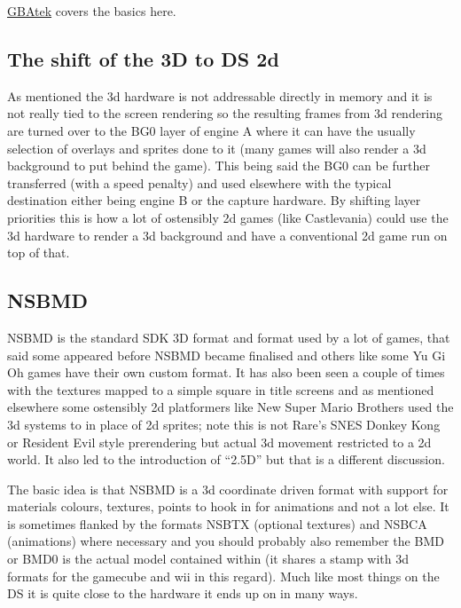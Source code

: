\documentclass[
]{book}
\begin{document}
\href{http://problemkaputt.de/gbatek.htm\#ds3dmatrixloadmultiply}{GBAtek} covers the basics here.

\hypertarget{the-shift-of-the-3d-to-ds-2d}{%
\subsection{The shift of the 3D to DS 2d}\label{the-shift-of-the-3d-to-ds-2d}}

As mentioned the 3d hardware is not addressable directly in memory and it is not really tied to the screen rendering so the resulting frames from 3d rendering are turned over to the BG0 layer of engine A where it can have the usually selection of overlays and sprites done to it (many games will also render a 3d background to put behind the game). This being said the BG0 can be further transferred (with a speed penalty) and used elsewhere with the typical destination either being engine B or the capture hardware. By shifting layer priorities this is how a lot of ostensibly 2d games (like Castlevania) could use the 3d hardware to render a 3d background and have a conventional 2d game run on top of that.

\hypertarget{nsbmd}{%
\subsection{NSBMD}\label{nsbmd}}

NSBMD is the standard SDK 3D format and format used by a lot of games, that said some appeared before NSBMD became finalised and others like some Yu Gi Oh games have their own custom format. It has also been seen a couple of times with the textures mapped to a simple square in title screens and as mentioned elsewhere some ostensibly 2d platformers like New Super Mario Brothers used the 3d systems to in place of 2d sprites; note this is not Rare's SNES Donkey Kong or Resident Evil style prerendering but actual 3d movement restricted to a 2d world. It also led to the introduction of ``2.5D'' but that is a different discussion.

The basic idea is that NSBMD is a 3d coordinate driven format with support for materials colours, textures, points to hook in for animations and not a lot else. It is sometimes flanked by the formats NSBTX (optional textures) and NSBCA (animations) where necessary and you should probably also remember the BMD or BMD0 is the actual model contained within (it shares a stamp with 3d formats for the gamecube and wii in this regard). Much like most things on the DS it is quite close to the hardware it ends up on in many ways.
\end{document}
